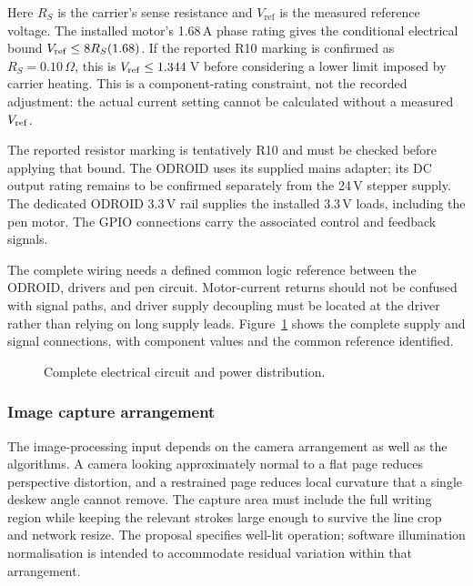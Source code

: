 Here $R_S$ is the carrier's sense resistance and $V_{\mathrm{ref}}$ is the measured reference voltage. The installed motor's 1.68\,A phase rating gives the conditional electrical bound $V_{\rm ref}\leq8R_S(1.68)$. If the reported R10 marking is confirmed as $R_S=0.10\,\Omega$, this is $V_{\rm ref}\leq1.344$\,V before considering a lower limit imposed by carrier heating. This is a component-rating constraint, not the recorded adjustment: the actual current setting cannot be calculated without a measured $V_{\rm ref}$.

The reported resistor marking is tentatively R10 and must be checked before applying that bound. The ODROID uses its supplied mains adapter; its DC output rating remains to be confirmed separately from the 24\,V stepper supply. The dedicated ODROID 3.3\,V rail supplies the installed 3.3\,V loads, including the pen motor. The GPIO connections carry the associated control and feedback signals.

The complete wiring needs a defined common logic reference between the ODROID, drivers and pen circuit. Motor-current returns should not be confused with signal paths, and driver supply decoupling must be located at the driver rather than relying on long supply leads. Figure~\ref{fig:des-complete-circuit} shows the complete supply and signal connections, with component values and the common reference identified.


\begin{figure}[!htbp]\centering
{}
\caption{Complete electrical circuit and power distribution.}
\label{fig:des-complete-circuit}
\end{figure}


\subsubsection{Image capture arrangement}
\label{sec:des-camera}
The image-processing input depends on the camera arrangement as well as the algorithms. A camera looking approximately normal to a flat page reduces perspective distortion, and a restrained page reduces local curvature that a single deskew angle cannot remove. The capture area must include the full writing region while keeping the relevant strokes large enough to survive the line crop and network resize. The proposal specifies well-lit operation; software illumination normalisation is intended to accommodate residual variation within that arrangement.


